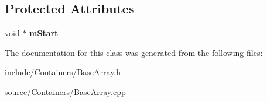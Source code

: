 \subsection*{Protected Attributes}
\begin{DoxyCompactItemize}
\item 
void $\ast$ {\bfseries m\+Start}\hypertarget{classDE_1_1BaseArray_a75351ce437cb954191bd17e6ca722a9c}{}\label{classDE_1_1BaseArray_a75351ce437cb954191bd17e6ca722a9c}

\end{DoxyCompactItemize}


The documentation for this class was generated from the following files\+:\begin{DoxyCompactItemize}
\item 
include/\+Containers/Base\+Array.\+h\item 
source/\+Containers/Base\+Array.\+cpp\end{DoxyCompactItemize}
